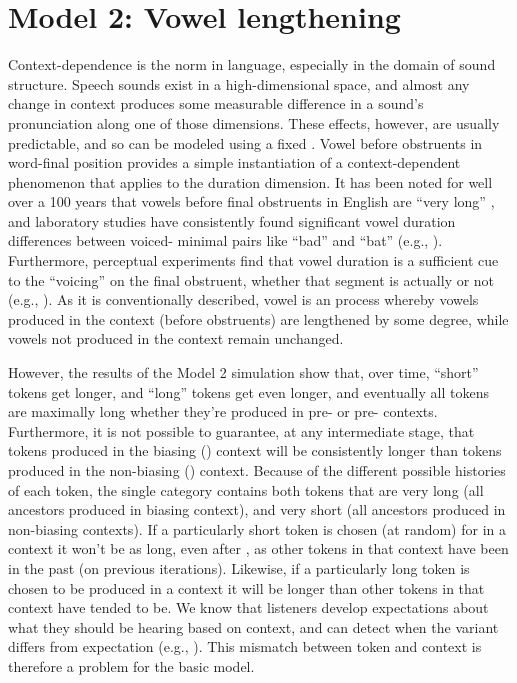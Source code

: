 \section{\label{subsec:Model-2:-Lengthening}Model 2: Vowel lengthening}

Context-dependence is the norm in language, especially in the domain
of sound structure. Speech sounds exist in a high-dimensional space,
and almost any change in context produces some measurable difference
in a sound's pronunciation along one of those dimensions. These effects,
however, are usually predictable, and so can be modeled using a fixed
. Vowel  before  obstruents in word-final position
provides a simple instantiation of a context-dependent phenomenon
that applies to the duration dimension. It has been noted for well
over a 100 years that vowels before final  obstruents in English
are “very long” \citep[59]{Sweet1880}, and laboratory
studies have consistently found significant vowel duration differences
between voiced- minimal pairs like “bad” and “bat”
(e.g., \citealt{peterson1960duration,chen1970vowel}). Furthermore,
perceptual experiments find that vowel duration is a sufficient cue
to the “voicing” on the final obstruent, whether that segment
is actually  or not (e.g., \citealt{raphael1972preceding,Klatt1976}).
As it is conventionally described, vowel  is an 
process whereby vowels produced in the  context (before
 obstruents) are lengthened by some degree, while vowels not
produced in the  context remain unchanged.

However, the results of the Model 2 simulation show that, over time,
“short” tokens get longer, and “long” tokens get even
longer, and eventually all tokens are maximally long whether they're
produced in pre- or pre- contexts. Furthermore, it
is not possible to guarantee, at any intermediate stage, that tokens
produced in the biasing () context will be consistently longer
than tokens produced in the non-biasing () context. Because
of the different possible histories of each token, the single category
contains both tokens that are very long (all ancestors produced in
biasing context), and very short (all ancestors produced in non-biasing
contexts). If a particularly short token is chosen (at random) for
 in a  context it won't be as long, even after ,
as other tokens in that context have been in the past (on previous
iterations). Likewise, if a particularly long token is chosen to be
produced in a  context it will be longer than other tokens
in that context have tended to be. We know that listeners develop
expectations about what they should be hearing based on context, and
can detect when the variant differs from expectation (e.g., \citealp{krakow1988coarticulatory,gaskell1996phonological}).
This mismatch between token and context is therefore a problem for
the basic  model. 

